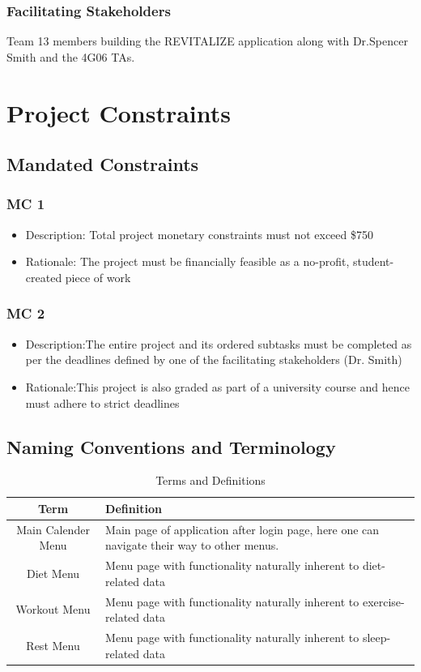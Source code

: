 \documentclass[12pt,letterpaper]{article}
\begin{document}
\subsubsection{Facilitating Stakeholders}
Team 13 members building the REVITALIZE application along with Dr.Spencer Smith and the 4G06 TAs.

\section{Project Constraints}
\subsection{Mandated Constraints}
\subsubsection{MC 1}
\begin{itemize}
\item Description: Total project monetary constraints must not exceed \$750\\
\item Rationale: The project must be financially feasible as a no-profit, student-created piece of work
\end{itemize}

\subsubsection{MC 2}
\begin{itemize}
\item Description:The entire project and its ordered subtasks must be completed as per the deadlines defined by one of the facilitating stakeholders (Dr. Smith)
\item Rationale:This project is also graded as part of a university course and hence must adhere to strict deadlines
\end{itemize}

\subsection{Naming Conventions and Terminology}
\label{sub:Naming Conventions and Terminology}
\begin{table}[H]
\caption{Terms and Definitions}
\centering
\begin{tabular}{|c|p{10cm}|}
\hline
\textbf{Term} & \textbf{Definition}\\
\hline
Main Calender Menu & Main page of application after login page, here one can navigate their way  to other menus.\\
\hline
Diet Menu & Menu page with functionality naturally inherent to diet-related data\\
\hline
Workout Menu & Menu page with functionality naturally inherent to exercise-related data\\
\hline
Rest Menu &Menu page with functionality naturally inherent to sleep-related data\\
\hline
\end{tabular}
\end{table}
\end{document}
